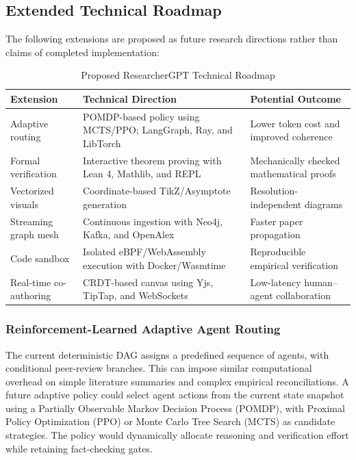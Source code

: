 \documentclass[conference]{IEEEtran}
\begin{document}
\subsection{Extended Technical Roadmap}
The following extensions are proposed as future research directions rather than claims of completed implementation:
\begin{table}[!t]
\centering
\caption{Proposed ResearcherGPT Technical Roadmap}
\label{tab:roadmap}
\footnotesize
\begin{tabularx}{\columnwidth}{@{}lX X@{}}
\toprule
\textbf{Extension} & \textbf{Technical Direction} & \textbf{Potential Outcome}\\
\midrule
Adaptive routing & POMDP-based policy using MCTS/PPO; LangGraph, Ray, and LibTorch & Lower token cost and improved coherence\\
Formal verification & Interactive theorem proving with Lean 4, Mathlib, and REPL & Mechanically checked mathematical proofs\\
Vectorized visuals & Coordinate-based TikZ/Asymptote generation & Resolution-independent diagrams\\
Streaming graph mesh & Continuous ingestion with Neo4j, Kafka, and OpenAlex & Faster paper propagation\\
Code sandbox & Isolated eBPF/WebAssembly execution with Docker/Wasmtime & Reproducible empirical verification\\
Real-time co-authoring & CRDT-based canvas using Yjs, TipTap, and WebSockets & Low-latency human--agent collaboration\\
\bottomrule
\end{tabularx}
\end{table}
\subsubsection{Reinforcement-Learned Adaptive Agent Routing}
The current deterministic DAG assigns a predefined sequence of agents, with conditional peer-review branches. This can impose similar computational overhead on simple literature summaries and complex empirical reconciliations. A future adaptive policy could select agent actions from the current state snapshot using a Partially Observable Markov Decision Process (POMDP), with Proximal Policy Optimization (PPO) or Monte Carlo Tree Search (MCTS) as candidate strategies. The policy would dynamically allocate reasoning and verification effort while retaining fact-checking gates.
\end{document}
